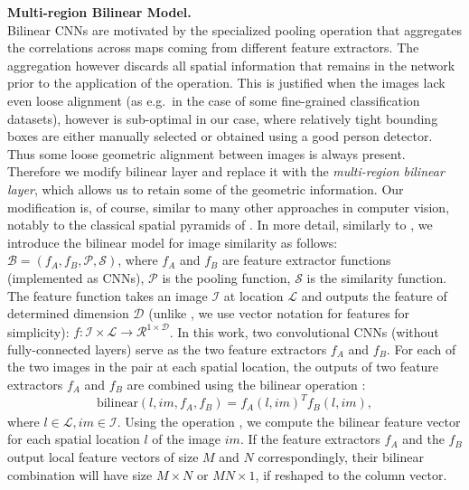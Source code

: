 \indent\textbf{Multi-region Bilinear Model.}\\
Bilinear CNNs are motivated by the specialized pooling operation that aggregates the correlations across maps coming from different feature extractors. The aggregation however discards all spatial information that remains in the network prior to the application of the operation. This is justified when the images lack even loose alignment (as e.g.\ in the case of some fine-grained classification datasets), however is sub-optimal in our case, where relatively tight bounding boxes are either manually selected or obtained using a good person detector.  Thus some loose geometric alignment between images is always present. Therefore we modify bilinear layer and replace it with the  \textit{multi-region bilinear layer}, which allows us to retain some of the geometric information. Our modification is, of course, similar to many other approaches in computer vision, notably to the classical spatial pyramids of \citep{Lazebnik06}.
In more detail, similarly to \citep{lin2015bilinear}, we introduce the bilinear model for image similarity as follows: 
\\ $\mathcal{B} = ({f_{A}^{}}, {f_{B}^{}}, \mathcal{P}, \mathcal{S})  $, where ${f_{A}^{}}$ and ${f_{B}^{}}$ are feature extractor functions (implemented as CNNs), $\mathcal{P}$ is the pooling function, $\mathcal{S}$ is the similarity function. The feature function takes an image ${\mathcal{I}}$ at location $\mathcal{L}$ and outputs the feature of determined dimension $\mathcal{D}$ (unlike \citep{lin2015bilinear}, we use vector notation for features for simplicity): $f : \mathcal{I} \times \mathcal{L} \rightarrow \mathcal{R}_{}^{1 \times \mathcal{D}}$. In this work, two convolutional CNNs (without fully-connected layers) serve as the two feature extractors $f_{A}^{}$ and $f_{B}^{}$. For each of the two images in the pair at each spatial location, the outputs of two feature extractors $f_{A}^{}$ and $f_{B}^{}$ 
are combined using the bilinear operation \citep{lin2015bilinear}: 
\begin{equation}
 \label{eq:bilinear}
\text{bilinear}(l, im, {f_{A}^{}}, {f_{B}^{}}) = {{f_{A}^{}}(l, im)_{}^{T}{f_{B}^{}}(l, im)},
\end{equation}
where $l \in \mathcal{L}, im \in \mathcal{I}$.
Using the operation , we compute the bilinear feature vector for each spatial location $l$ of the image $im$. If the feature extractors $f_{A}^{}$ and the $f_{B}^{}$ output local feature vectors of size $M$ and $N$ correspondingly, their bilinear combination will have size $M \times N$ or $MN \times 1$, if reshaped to the column vector. 

